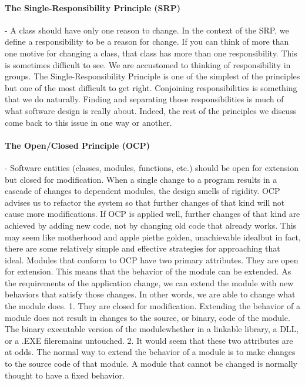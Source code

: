 \documentclass{llncs}
\begin{document}
\paragraph{The Single-Responsibility Principle (SRP)} - A class should have only one reason to change.
In the context of the SRP, we define a responsibility to be a reason for change.
If you can think of more than one motive for changing a class, that class has more than one responsibility.
This is sometimes difficult to see. We are accustomed to thinking of responsibility in groups. 
The Single-Responsibility Principle is one of the simplest of the principles but one of the most difficult to get right.
Conjoining responsibilities is something that we do naturally.
Finding and separating those responsibilities is much of what software design is really about.
Indeed, the rest of the principles we discuss come back to this issue in one way or another.\cite{MartinASD}\cite{Dooley}


\paragraph{The Open/Closed Principle (OCP)} - Software entities (classes, modules, functions, etc.) should be open for extension but
closed for modification.
When a single change to a program results in a cascade of changes to dependent modules, the design smells of rigidity. 
OCP advises us to refactor the system so that further changes of that kind will not cause more modifications. 
If OCP is applied well, further changes of that kind are achieved by adding new code, not by changing old code that already works. 
This may seem like motherhood and apple piethe golden, unachievable idealbut in fact, there are some relatively simple and effective
strategies for approaching that ideal.
Modules that conform to OCP have two primary attributes.
They are open for extension. This means that the behavior of the module can be extended.
As the requirements of the application change, we can extend the module with new behaviors that satisfy those changes. 
In other words, we are able to change what the module does.
1. They are closed for modification. Extending the behavior of a module does not result in changes to the source, or binary, code of the module.
The binary executable version of the modulewhether in a linkable library, a DLL, or a .EXE fileremains untouched.
2. It would seem that these two attributes are at odds. 
The normal way to extend the behavior of a module is to make changes to the source code of that module. 
A module that cannot be changed is normally thought to have a fixed behavior.
\end{document}
